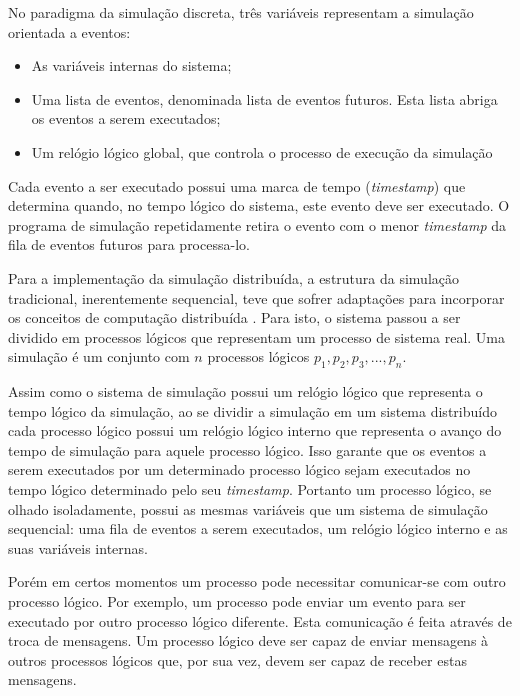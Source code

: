 No paradigma da simulação discreta, três variáveis representam a simulação orientada a eventos:

\begin{itemize}
\item As variáveis internas do sistema;
\item Uma lista de eventos, denominada lista de eventos futuros. Esta lista abriga os eventos a serem executados;
\item Um relógio lógico global, que controla o processo de execução da simulação
\end{itemize}

Cada evento a ser executado possui uma marca  de tempo (\textit{timestamp}) que determina quando, no tempo lógico do sistema, este evento deve ser executado. O programa de simulação repetidamente retira o evento com o menor \textit{timestamp} da fila de eventos futuros para processa-lo.

Para a implementação da simulação distribuída, a estrutura da simulação tradicional, inerentemente sequencial, teve que sofrer adaptações para incorporar os conceitos de computação distribuída \cite{REED-MALONY}. Para isto, o sistema passou a ser dividido em processos lógicos que representam um processo de sistema real. Uma simulação é um conjunto com $n$ processos lógicos $p_{1}, p_{2}, p_{3}, ..., p_{n}$.


Assim como o sistema de simulação possui um relógio lógico que representa o tempo lógico da simulação, ao se dividir a simulação em um sistema distribuído cada processo lógico possui um relógio lógico interno que representa o avanço do tempo de simulação para aquele processo lógico. Isso garante que os eventos a serem executados por um determinado processo lógico sejam executados no tempo lógico determinado pelo seu \textit{timestamp}. Portanto um processo lógico, se olhado isoladamente, possui as mesmas variáveis que um sistema de simulação sequencial: uma fila de eventos a serem executados, um relógio lógico interno e as suas variáveis internas.


Porém em certos momentos um processo pode necessitar comunicar-se com outro processo lógico. Por exemplo, um processo pode enviar um evento para ser executado por outro processo lógico diferente. Esta comunicação é feita através de troca de mensagens. Um processo lógico deve ser capaz de enviar mensagens à outros processos lógicos que, por sua vez, devem ser capaz de receber estas mensagens. 

